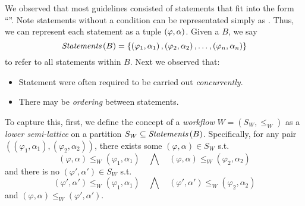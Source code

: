 We observed that most guidelines consisted of statements that fit
into the form ``''. Note
statements without a condition can be representated simply as .
Thus, we can represent each statement as a tuple ${\left(\varphi, \alpha\right)}{}$.
Given a \BPG{} $B$, we say
\[
\textit{Statements}\left(B\right) =
\left\{\left(\varphi_1,\alpha_1\right),\left(\varphi_2,\alpha_2\right),\dots,\left(\varphi_n,\alpha_n\right)\right\}
\]
to refer to all statements within $B$. Next we observed that:
\begin{itemize}
  \item Statement were often required to be carried out \emph{concurrently}.
  \item There may be \emph{ordering} between statements.
\end{itemize}
To capture this, first, we define the concept of a \emph{workflow}
$W = \left(S_W, \leq_W\right)$ as a \emph{lower semi-lattice} on a partition $S_W \subseteq \textit{Statements}\left(B\right)$.
Specifically, for any pair $\left(\left(\varphi_1,\alpha_1\right),
\left(\varphi_2, \alpha_2\right)\right)$, there exists some
$\left(\varphi,\alpha\right) \in S_W$ s.t.
\[
    \left(\varphi,\alpha\right) \leq_W
    \left(\varphi_1,\alpha_1\right)\quad\bigwedge\quad
    \left(\varphi,\alpha\right) \leq_W \left(\varphi_2,\alpha_2\right)
\]
\noindent and there is no $\left(\varphi',\alpha'\right) \in S_W$ s.t.
\[
    \left(\varphi',\alpha'\right) \leq_W
    \left(\varphi_1,\alpha_1\right)\quad\bigwedge\quad\left(\varphi',\alpha'\right) \leq_W
    \left(\varphi_2,\alpha_2\right)
\]
\noindent and $\left(\varphi,\alpha\right) \leq_W \left(\varphi',\alpha'\right)$.

